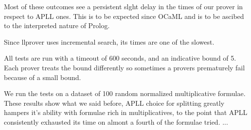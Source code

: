 \documentclass[a4paper, 12pt, tesi, english]{report}
\begin{document}
Most of these outcomes see a persistent slght delay in the times of our prover in respect to APLL ones.
This is to be expected since OCaML and is to be ascibed to the interpreted nature of Prolog.

Since llprover uses incremental search, its times are one of the slowest.

All tests are run with a timeout of 600 seconds, and an indicative bound of 5.
Each prover treats the bound differently so sometimes a provers prematurely fail because of a small bound. 

We run the tests on a dataset of 100 random normalized multiplicative formulae.
These results show what we said before, APLL choice for splitting greatly hampers it's ability with formulae rich in multiplicatives, to the point that APLL consistently exhausted its time on almont a fourth of the formulae tried.
...
\end{document}
